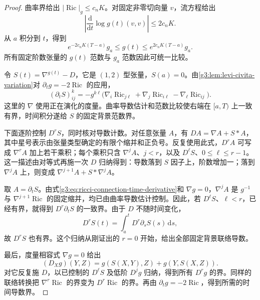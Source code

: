 \begin{proof}
 曲率界给出 \(|\operatorname{Ric}|_g\le c_nK\)。对固定非零切向量 \(v\)，流方程给出
 \[
  \left|\frac{\mathrm d}{\mathrm dt}\log g(t)(v,v)\right|
  \le2c_nK.
 \]
 从 \(a\) 积分到 \(t\)，得到
 \begin{equation}\label{g3:eq:ricci-metric-equivalence}
  e^{-2c_nK(T-a)}g_a\le g(t)\le e^{2c_nK(T-a)}g_a.
 \end{equation}
 所有固定阶数张量的 \(g(t)\) 范数与 \(g_a\) 范数因此可统一比较。

 令 \(S(t)=\nabla^{g(t)}-D\)，它是 \((1,2)\) 型张量，\(S(a)=0\)。由\cref{g3:lem:levi-civita-variation}对 \(\partial_tg=-2\operatorname{Ric}\) 的应用，
 \begin{equation}\label{g3:eq:ricci-connection-time-derivative}
  (\partial_tS)^k_{ij}
  =-g^{k\ell}\bigl(
    \nabla_i\operatorname{Ric}_{j\ell}
   +\nabla_j\operatorname{Ric}_{i\ell}
   -\nabla_\ell\operatorname{Ric}_{ij}\bigr).
 \end{equation}
 这里的 \(\nabla\) 使用正在演化的度量。曲率导数估计和范数比较使右端在 \([a,T)\) 上一致有界，时间积分遂给 \(S\) 的固定背景范数界。

 下面逐阶控制 \(D^rS\)，同时核对导数计数。对任意张量 \(A\)，有 \(DA=\nabla A+S*A\)，其中星号表示由张量类型确定的有限个缩并和正负号。反复使用此式，\(D^rA\) 可写成 \(\nabla^rA\) 加上若干乘积；每个乘积只含 \(\nabla^jA\)、\(j<r\)，以及 \(D^\ell S\)、\(0\le\ell\le r-1\)。这一描述由对等式再施一次 \(D\) 归纳得到：导数落到 \(S\) 因子上，阶数增加一；落到 \(\nabla^jA\) 上，则变成 \(\nabla^{j+1}A+S*\nabla^jA\)。

 取 \(A=\partial_tS\)。由式\eqref{g3:eq:ricci-connection-time-derivative}和 \(\nabla g=0\)，\(\nabla^jA\) 是 \(g^{-1}\) 与 \(\nabla^{j+1}\operatorname{Ric}\) 的固定缩并，均已由曲率导数估计控制。因此，若 \(D^\ell S\)、\(\ell<r\)，已经有界，就得到 \(D^r\partial_tS\) 的一致界。由于 \(D\) 不随时间变化，
 \[
  D^rS(t)=\int_a^tD^r\partial_sS(s)\,\mathrm ds,
 \]
 故 \(D^rS\) 也有界。这个归纳从刚证出的 \(r=0\) 开始，给出全部固定背景联络导数。

 最后，度量相容式 \(\nabla g=0\) 给出
 \[
  (D_Xg)(Y,Z)=g(S(X,Y),Z)+g(Y,S(X,Z)).
 \]
 对它反复施 \(D\)，以已控制的 \(D^\ell S\) 及低阶 \(D^jg\) 归纳，得到所有 \(D^rg\) 的界。同样的联络转换把 \(\nabla^r\operatorname{Ric}\) 的界变为 \(D^r\operatorname{Ric}\) 的界。再由 \(\partial_tg=-2\operatorname{Ric}\)，得到所需的时间导数界。
\end{proof}

